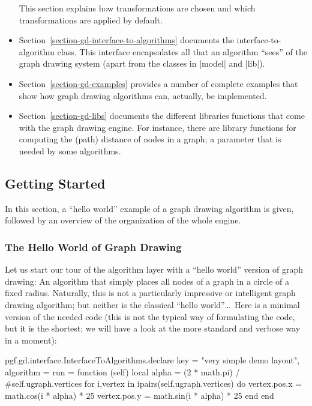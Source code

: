 \begin{itemize}
  This section explains how transformations are chosen and which
  transformations are applied by default.
\item Section~\ref{section-gd-interface-to-algorithms} documents the
  interface-to-algorithm class. This interface encapsulates all that
  an algorithm ``sees'' of the graph drawing system (apart from the
  classes in |model| and |lib|).
\item Section~\ref{section-gd-examples} provides a number of complete
  examples that show how graph drawing algorithms can, actually, be
  implemented. 
\item Section~\ref{section-gd-libs} documents the different
  libraries functions that come with the graph drawing engine. For
  instance, there are library functions for computing the (path)
  distance of nodes in a graph; a parameter that is needed by some
  algorithms.
\end{itemize}



\subsection{Getting Started}

In this section, a ``hello world'' example of a graph
drawing algorithm  is given, followed by an overview of the
organization of the whole engine.


\subsubsection{The Hello World of Graph Drawing}

Let us start our tour of the algorithm layer with a ``hello world''
version of graph drawing: An algorithm that simply places all nodes of
a graph in a circle of a fixed radius. Naturally, this is not a
particularly impressive or intelligent graph drawing algorithm; but
neither is the classical ``hello world''\dots\ Here is a minimal
version of the needed code (this is not the typical way of formulating
the code, but it is the shortest; we will have a look at the more
standard and verbose way in a moment):

\begin{codeexample}
pgf.gd.interface.InterfaceToAlgorithms.declare {
  key = "very simple demo layout",
  algorithm = {
    run =
      function (self)
        local alpha = (2 * math.pi) / #self.ugraph.vertices
        for i,vertex in ipairs(self.ugraph.vertices) do
          vertex.pos.x = math.cos(i * alpha) * 25
          vertex.pos.y = math.sin(i * alpha) * 25
        end
      end
  }
}
\end{codeexample}

